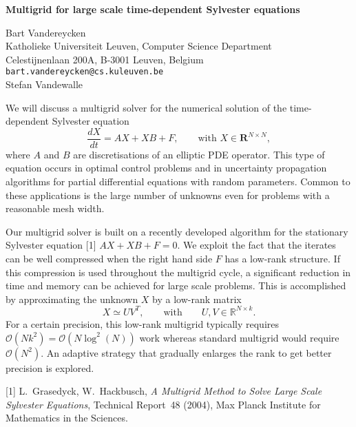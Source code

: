 \documentclass{report}
\newcommand{\Reals}{\mathbb{R}}
\begin{document}

\begin{center}
{\large
{\bf Multigrid for large scale time-dependent Sylvester equations}}

	Bart Vandereycken \\
	Katholieke Universiteit Leuven, Computer Science Department \\
	Celestijnenlaan 200A, B-3001 Leuven, Belgium \\
	{\tt bart.vandereycken@cs.kuleuven.be} \\
	Stefan Vandewalle
\end{center}
We will discuss a multigrid solver for the numerical
solution of the time-dependent Sylvester equation
\begin{equation*} \frac{dX}{dt} = A X + X B + F, \qquad
\text{with $X \in \mathbf{R}^{N\times N}$}, \end{equation*}
where $A$ and $B$ are discretisations of an elliptic PDE
operator. This type of equation occurs in optimal control
problems and in uncertainty propagation algorithms for
partial differential equations with random parameters.
Common to these applications is the large number of unknowns
even for problems with a reasonable mesh width.

 Our
multigrid solver is built on a recently developed algorithm
for the stationary Sylvester equation [1]
$A X + X B + F = 0$.
We exploit the fact that the iterates can be well compressed
when the right hand side $F$ has a low-rank structure. If
this compression is used throughout the multigrid cycle, a
significant reduction in time and memory can be achieved for
large scale problems. This is accomplished by approximating
the unknown $X$ by a low-rank matrix
$$
X \simeq UV^T,
\qquad \mbox{with} \qquad
U,V \in \Reals^{N\times k}.
$$
For a certain precision, this low-rank
multigrid typically requires
$\mathcal{O}(Nk^2) = \mathcal{O}(N\log^2(N))$
work whereas standard multigrid
would require $\mathcal{O}(N^2)$. An adaptive strategy that
gradually enlarges the rank to get better precision is
explored.

[1]
L.~Grasedyck, W.~Hackbusch,
{\em A Multigrid Method to Solve Large Scale Sylvester
Equations}, Technical Report~48 (2004),
Max Planck Institute for Mathematics in the Sciences.



\end{document}
